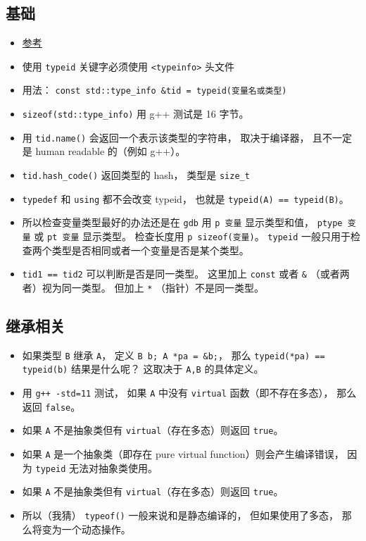 
\begin{issues}
\issueDraft
\end{issues}

\subsection{基础}
\begin{itemize}
\item \href{https://en.cppreference.com/w/cpp/language/typeid}{参考}
\item 使用 \verb`typeid` 关键字必须使用 \verb`<typeinfo>` 头文件
\item 用法： \verb`const std::type_info &tid = typeid(变量名或类型)`
\item \verb`sizeof(std::type_info)` 用 g++ 测试是 16 字节。
\item 用 \verb`tid.name()` 会返回一个表示该类型的字符串， 取决于编译器， 且不一定是 human readable 的（例如 g++）。
\item \verb`tid.hash_code()` 返回类型的 hash， 类型是 \verb`size_t`
\item \verb`typedef` 和 \verb`using` 都不会改变 typeid， 也就是 \verb`typeid(A) == typeid(B)`。
\item 所以检查变量类型最好的办法还是在 \verb`gdb` 用 \verb`p 变量` 显示类型和值， \verb`ptype 变量` 或 \verb`pt 变量` 显示类型。 检查长度用 \verb`p sizeof(变量)`。 \verb`typeid` 一般只用于检查两个类型是否相同或者一个变量是否是某个类型。
\item \verb`tid1 == tid2` 可以判断是否是同一类型。 这里加上 \verb`const` 或者 \verb`&` （或者两者）视为同一类型。 但加上 \verb`*` （指针）不是同一类型。
\end{itemize}

\subsection{继承相关}
\begin{itemize}
\item 如果类型 \verb`B` 继承 \verb`A`， 定义 \verb`B b; A *pa = &b;`， 那么 \verb`typeid(*pa) == typeid(b)` 结果是什么呢？ 这取决于 \verb`A,B` 的具体定义。
\item 用 \verb`g++ -std=11` 测试， 如果 \verb`A` 中没有 \verb`virtual` 函数（即不存在多态）， 那么返回 \verb`false`。
\item 如果 \verb`A` 不是抽象类但有 \verb`virtual`（存在多态）则返回 \verb`true`。
\item 如果 \verb`A` 是一个抽象类（即存在 pure virtual function）则会产生编译错误， 因为 \verb`typeid` 无法对抽象类使用。
\item 如果 \verb`A` 不是抽象类但有 \verb`virtual`（存在多态）则返回 \verb`true`。
\item 所以（我猜） \verb`typeof()` 一般来说和是静态编译的， 但如果使用了多态， 那么将变为一个动态操作。
\end{itemize}
